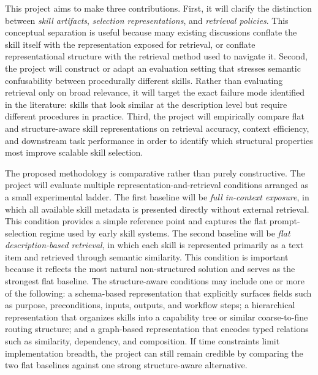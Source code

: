\documentclass[a4paper]{article}
\begin{document}
This project aims to make three contributions. First, it will clarify the distinction between \emph{skill artifacts}, \emph{selection representations}, and \emph{retrieval policies}. This conceptual separation is useful because many existing discussions conflate the skill itself with the representation exposed for retrieval, or conflate representational structure with the retrieval method used to navigate it. Second, the project will construct or adapt an evaluation setting that stresses semantic confusability between procedurally different skills. Rather than evaluating retrieval only on broad relevance, it will target the exact failure mode identified in the literature: skills that look similar at the description level but require different procedures in practice. Third, the project will empirically compare flat and structure-aware skill representations on retrieval accuracy, context efficiency, and downstream task performance in order to identify which structural properties most improve scalable skill selection.

The proposed methodology is comparative rather than purely constructive. The project will evaluate multiple representation-and-retrieval conditions arranged as a small experimental ladder. The first baseline will be \emph{full in-context exposure}, in which all available skill metadata is presented directly without external retrieval. This condition provides a simple reference point and captures the flat prompt-selection regime used by early skill systems. The second baseline will be \emph{flat description-based retrieval}, in which each skill is represented primarily as a text item and retrieved through semantic similarity. This condition is important because it reflects the most natural non-structured solution and serves as the strongest flat baseline. The structure-aware conditions may include one or more of the following: a schema-based representation that explicitly surfaces fields such as purpose, preconditions, inputs, outputs, and workflow steps; a hierarchical representation that organizes skills into a capability tree or similar coarse-to-fine routing structure; and a graph-based representation that encodes typed relations such as similarity, dependency, and composition. If time constraints limit implementation breadth, the project can still remain credible by comparing the two flat baselines against one strong structure-aware alternative.
\end{document}
